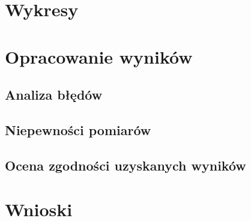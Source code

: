 \documentclass[a4paper,10pt,twoside]{article}
\begin{document}
\section{Wykresy}

\section{Opracowanie wyników}

\subsection{Analiza błędów}

\subsection{Niepewności pomiarów}


\subsection{Ocena zgodności uzyskanych wyników}

\section{Wnioski}
\end{document}
